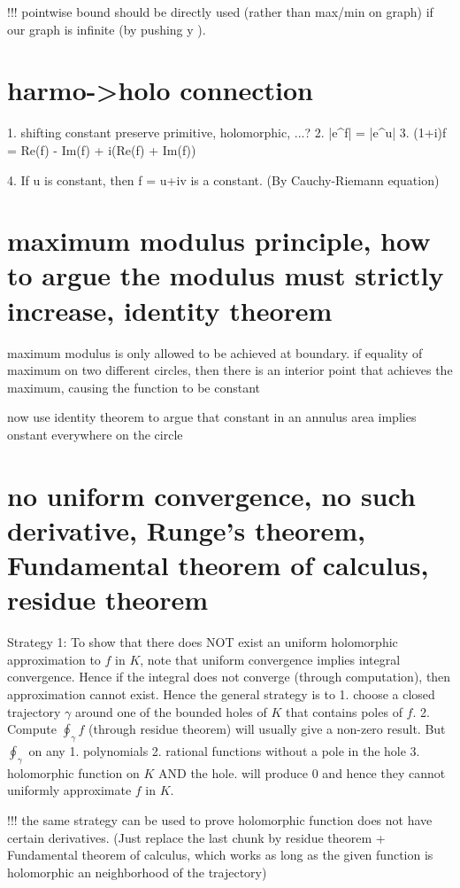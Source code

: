 !!! pointwise bound should be directly used (rather than max/min on graph) if our graph is infinite (by pushing y \to \infty).



\section{harmo->holo connection}
1. shifting constant
    preserve primitive, holomorphic, ...?
2. |e^f| = |e^u|
3. (1+i)f = Re(f) - Im(f) + i(Re(f) + Im(f))

4. If u is constant, then f = u+iv is a constant. (By Cauchy-Riemann equation)

\section{maximum modulus principle, how to argue the modulus must strictly increase, identity theorem}
maximum modulus is only allowed to be achieved at boundary. if equality of maximum on two different circles, then there is an interior point that achieves the maximum, causing the function to be constant

now use identity theorem to argue that constant in an annulus area implies onstant everywhere on the circle


\section{no uniform convergence, no such derivative, Runge's theorem, Fundamental theorem of calculus, residue theorem}
Strategy 1: To show that there does NOT exist an uniform holomorphic approximation to $f$ in $K$, note that uniform convergence implies integral convergence. Hence if the integral does not converge (through computation), then approximation cannot exist. Hence the general strategy is to 
	1. choose a closed trajectory $\gamma$ around one of the bounded holes of $K$ that contains poles of $f$. 
    2. Compute $\oint_\gamma f$ (through residue theorem) will usually give a non-zero result. But $\oint_\gamma$ on any 
    	1. polynomials
    	2. rational functions without a pole in the hole
    	3. holomorphic function on $K$ AND the hole.
	will produce 0 and hence they cannot uniformly approximate $f$ in $K$.
	
!!! the same strategy can be used to prove holomorphic function does not have certain derivatives. (Just replace the last chunk by residue theorem + Fundamental theorem of calculus, which works as long as the given function is holomorphic an neighborhood of the trajectory)
	
